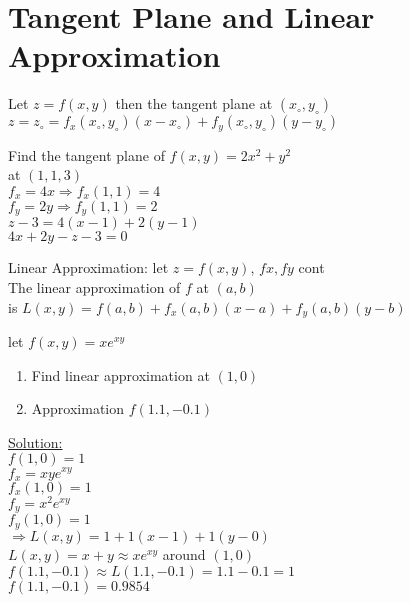 \section{Tangent Plane and Linear Approximation}
Let $z=f(x,y)$ then the tangent plane at $(x_\circ,y_\circ)$\\
$z=z_\circ=f_x(x_\circ,y_\circ)(x-x_\circ)+f_y(x_\circ,y_\circ)(y-y_\circ)$\\
\noindent{\color{smalt(darkpowderblue)}\rule{\linewidth}{.2mm}}

\begin{example}
Find the tangent plane of $f(x,y)=2x^2+y^2$\\
at $(1,1,3)$\\
$f_x=4x\Rightarrow f_x(1,1)=4$\\
$f_y=2y\Rightarrow f_y(1,1)=2$\\
$z-3=4(x-1)+2(y-1)$\\
$4x+2y-z-3=0$
\end{example}
\noindent{\color{smalt(darkpowderblue)}\rule{\linewidth}{.2mm}}
Linear Approximation: let $z=f(x,y)$, $fx,fy$ cont\\
The linear approximation of $f$ at $(a,b)$\\
is $L(x,y)=f(a,b)+f_x(a,b)(x-a)+f_y(a,b)(y-b)$\\
\noindent{\color{smalt(darkpowderblue)}\rule{\linewidth}{.2mm}}

\begin{example}
let $f(x,y)=x e^{x y}$
\begin{enumerate}
    \item Find linear approximation at $(1,0)$ 
    \item Approximation $f(1.1,-0.1)$\\
\end{enumerate}
{\color{smalt(darkpowderblue)}\underline{Solution:}}\\
$f(1,0)=1$\\
$f_x=xye^{xy}$\\
$f_x(1,0)=1$\\
$f_y=x^2e^{xy}$\\
$f_y(1,0)=1$\\
$\Rightarrow L(x,y)=1+1(x-1)+1(y-0)$\\
$L(x,y)=x+y\approx xe^{xy}$ around $(1,0)$\\
$f(1.1,-0.1)\approx L(1.1,-0.1)=1.1-0.1=1$\\
$f(1.1,-0.1)=0.9854$
\end{example}
\noindent{\color{smalt(darkpowderblue)}\rule{\linewidth}{.2mm}}

